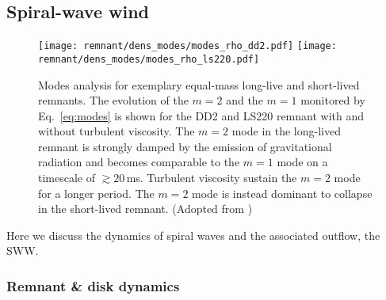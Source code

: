 

\subsection{Spiral-wave wind}

\label{sec:spiralw}


\begin{figure*}[t]
    \centering 
    \texttt{[image: remnant/dens\_modes/modes\_rho\_dd2.pdf]}
    \texttt{[image: remnant/dens\_modes/modes\_rho\_ls220.pdf]}
    \caption{Modes analysis for exemplary equal-mass long-live and short-lived
        remnants. The evolution of the $m=2$ and the $m=1$ monitored by
        Eq.~\eqref{eq:modes} is shown for the DD2 and LS220 remnant with and
        without turbulent viscosity. The $m=2$ mode in the long-lived
        remnant is strongly damped by the emission of gravitational
        radiation and becomes comparable to the $m=1$ mode on a timescale of
        ${\gtrsim}20\,$ms. Turbulent viscosity sustain the $m=2$ mode for
        a longer period. The $m=2$ mode is instead dominant to collapse in
        the short-lived remnant.
        (Adopted from \cite{Nedora:2020pak})
    }
    \label{fig:dens_modes}
\end{figure*}

Here we discuss the dynamics of spiral waves and the associated outflow, the \ac{SWW}.


\subsubsection{Remnant \& disk dynamics}


